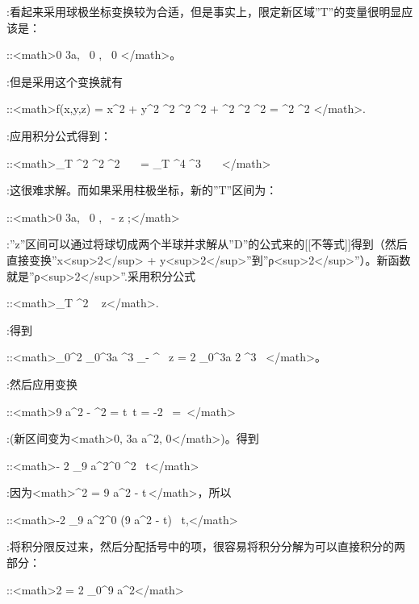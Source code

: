 \documentclass[UTF-8]{ctexart}
\begin{document}
:看起来采用球极坐标变换较为合适，但是事实上，限定新区域''T''的变量很明显应该是：

::<math>0 \le \rho \le 3a, \ 0 \le \phi {} \pi, \ 0 \le \theta \le \pi</math>。

:但是采用这个变换就有

::<math>f(x,y,z) = x^2 + y^2 \longrightarrow \rho^2 \sin^2 \theta \cos^2 \phi + \rho^2 \sin^2 \theta \sin^2 \phi = \rho^2 \sin^2 \theta</math>.

:应用积分公式得到：

::<math>\iiint_T \rho^2 \sin^2 \theta \rho^2 \sin \theta \, \rho\, \theta\, \phi = \iiint_T \rho^4 \sin^3 \theta \, \rho\, \theta\, \phi</math>

:这很难求解。而如果采用柱极坐标，新的''T''区间为：

::<math>0 \le \rho \le 3a, \ 0 \le \phi {} \pi, \ -  \le z \le {};</math>

:''z''区间可以通过将球切成两个半球并求解从''D''的公式来的[[不等式]]得到（然后直接变换''x<sup>2</sup> + y<sup>2</sup>''到''ρ<sup>2</sup>''）。新函数就是''ρ<sup>2</sup>''.采用积分公式

::<math>\iiint_T \rho^2 \rho \  \rho {} \phi {}z</math>.

:得到

::<math>\int_0^{2 \pi} \phi \int_0^{3a} \rho^3 \rho \int_{-  }^{ }\, z = 2 \pi \int_0^{3a} 2 \rho^3  \, \rho</math>。

:然后应用变换

::<math>9 a^2 - \rho^2 = t\,\! \longrightarrow {}t = -2 \rho\, \rho \longrightarrow {}\rho = \,\!</math>

:(新区间变为<math>0, 3a  a^2, 0</math>)。得到

::<math>- 2 \pi \int_{9 a^2}^{0} \rho^2 \, t</math>

:因为<math>\rho^2 = 9 a^2 - t\,\!</math>，所以

::<math>-2 \pi \int_{9 a^2}^0 (9 a^2 - t) \, t,</math>

:将积分限反过来，然后分配括号中的项，很容易将积分分解为可以直接积分的两部分：

::<math>2 \pi {} = 2 \pi {}_0^{9 a^2}</math>
\end{document}
